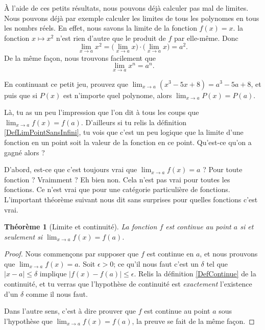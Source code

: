 \documentclass[a4paper,12pt]{book}
\newcounter{numtho}
\theoremstyle{mes_exemples}	\newtheorem{exemple}[numtho]{Exemple}
\theoremstyle{mes_tho}
\newtheorem{theorem}[numtho]{Théorème}
\begin{document}
À l'aide de ces petits résultats, nous pouvons déjà calculer pas mal de limites. Nous pouvons déjà par exemple calculer les limites de tous les polynomes en tous les nombrs réels. En effet, nous savons la limite de la fonction $f(x)=x$. la fonction $x\mapsto x^2$ n'est rien d'autre que le produit de $f$ par elle-même. Donc
\[ 
  \lim_{x\to a}x^2=\big( \lim_{x\to a}x\big)\cdot\big( \lim_{x\to a}x \big)=a^2.
\]
De la même façon, nous trouvons facilement que 
\begin{equation}
 \lim_{x\to a}x^n=a^n.
\end{equation}

\begin{exercice}
En continuant ce petit jeu, prouvez que $\lim_{x\to a}(x^3-5x+8)=a^3-5a+8$, et puis que si $P(x)$ est n'importe quel polynome, alors $\lim_{x\to a}P(x)=P(a)$.
\end{exercice}

Là, tu as un peu l'impression que l'on dit à tous les coups que $\lim_{x\to a}f(x)=f(a)$. D'ailleurs si tu relis la définition \ref{DefLimPointSansInfini}, tu vois que c'est un peu logique que la limite d'une fonction en un point soit la valeur de la fonction en ce point. Qu'est-ce qu'on a gagné alors ?

D'abord, est-ce que c'est toujours vrai que $\lim_{x\to a}f(x)=a$ ? Pour toute fonction ? Vraimment ? Eh bien non. Cela n'est pas vrai pour toutes les fonctions. Ce n'est vrai que pour une catégorie particulière de fonctions. L'important théorème suivant nous dit sans surprises pour quelles fonctions c'est vrai.

\begin{theorem}[Limite et continuité]			\label{ThoLimCont}
La fonction $f$ est continue au point $a$ si et seulement si $\lim_{x\to a}f(x)=f(a)$.
\end{theorem}

\begin{proof}
Nous commençons par supposer que $f$ est continue en $a$, et nous prouvons que $\lim_{x\to a}f(x)=a$. Soit $\epsilon>0$; ce qu'il nous faut c'est un $\delta$ tel que $| x-a |\leq\delta$ implique $| f(x)-f(a) |\leq\epsilon$. Relis la définition \ref{DefContinue} de la continuité, et tu verras que l'hypothèse de continuité est \emph{exactement} l'existence d'un $\delta$ comme il nous faut.

Dans l'autre sens, c'est à dire prouver que $f$ est continue au point $a$ sous l'hypothèse que $\lim_{x\to a}f(x)=f(a)$, la preuve se fait de la même façon.
\end{proof}
\end{document}
